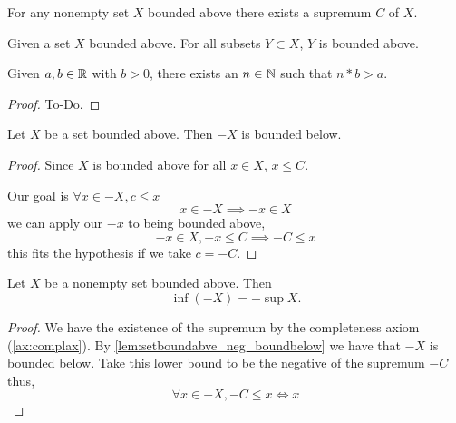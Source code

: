 \begin{axiom}\label{ax:complax}
   \leanok
  For any nonempty set $X$ bounded above there exists a supremum $C$ of $X$.
\end{axiom}

\begin{lemma}\label{lem:subsetboundbounded}
   \leanok
  Given a set $X$ bounded above.
  For all subsets $Y \subset X$,
  $Y$ is bounded above.
\end{lemma}

\begin{theorem}[Archimedes]\label{thm:archimedes}
   \leanok
  Given $a, b \in \mathbb{R}$ with $b > 0$,
  there exists an $n \in \mathbb{N}$ such that $n * b > a$.
\end{theorem}
\begin{proof}
  To-Do.
\end{proof}

\begin{lemma}\label{lem:setboundabve_neg_boundbelow}
   \leanok
  Let $X$ be a set bounded above.
  Then $-X$ is bounded below.
\end{lemma}
\begin{proof}
  Since $X$ is bounded above for all $x \in X$,
  $x \leq C$.

  Our goal is $\forall x \in -X, c \leq x$
  \[
  x \in -X \implies -x \in X
  \]
  we can apply our $-x$ to being bounded above,
  \[
  -x \in X, -x \leq C \implies -C \leq x
  \]
  this fits the hypothesis if we take $c = -C$.
\end{proof}

\begin{lemma}\label{lem:inf_eq_neg_sup}
    Let $X$ be a nonempty set bounded above.
    Then
    \[
    \inf(-X) = -\sup{X}.
    \]
\end{lemma}
\begin{proof}
    We have the existence of the supremum by the completeness axiom
    (\autoref{ax:complax}).
    By \autoref{lem:setboundabve_neg_boundbelow} we have that $-X$ is bounded below.
    Take this lower bound to be the negative of the supremum $-C$ thus,
    \[
    \forall x \in -X, -C \leq x \iff x 
    \]
\end{proof}

